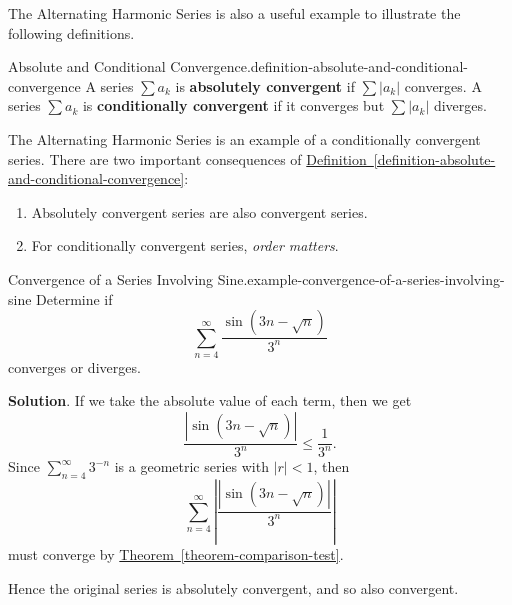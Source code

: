 \documentclass[10pt,]{book}
\newcommand{\terminology}[1]{\textbf{#1}}
\numberwithin{equation}{section}
\newcommand{\lt}{<}
\begin{document}
\hypertarget{p-905}{}%
The Alternating Harmonic Series is also a useful example to illustrate the following definitions.%
\begin{definition}{Absolute and Conditional Convergence.}{definition-absolute-and-conditional-convergence}%
\hypertarget{p-906}{}%
A series \(\sum a_{k}\) is \terminology{absolutely convergent} if \(\sum |a_{k}|\) converges. A series \(\sum a_{k}\) is \terminology{conditionally convergent} if it converges but \(\sum|a_{k}|\) diverges.%
\end{definition}
\hypertarget{p-907}{}%
The Alternating Harmonic Series is an example of a conditionally convergent series. There are two important consequences of \hyperref[definition-absolute-and-conditional-convergence]{Definition~\ref{definition-absolute-and-conditional-convergence}}: \leavevmode%
\begin{enumerate}
\item\hypertarget{li-99}{}\hypertarget{p-908}{}%
Absolutely convergent series are also convergent series.%
\item\hypertarget{li-100}{}\hypertarget{p-909}{}%
For conditionally convergent series, \emph{order matters}.%
\end{enumerate}
%
\begin{example}{Convergence of a Series Involving Sine.}{example-convergence-of-a-series-involving-sine}%
\hypertarget{p-910}{}%
Determine if%
\begin{equation*}
\sum_{n=4}^{\infty}\frac{\sin(3n - \sqrt{n})}{3^{n}}
\end{equation*}
converges or diverges.%
\par\smallskip%
\noindent\textbf{Solution}.\hypertarget{solution-187}{}\quad%
\hypertarget{p-911}{}%
If we take the absolute value of each term, then we get%
\begin{equation*}
\frac{|\sin(3n - \sqrt{n})|}{3^{n}} \leq \frac{1}{3^{n}}\text{.}
\end{equation*}
Since \(\sum_{n=4}^{\infty}3^{-n}\) is a geometric series with \(|r|\lt 1\), then%
\begin{equation*}
\sum_{n=4}^{\infty}\left|\frac{|\sin(3n - \sqrt{n})|}{3^{n}}\right|
\end{equation*}
must converge by \hyperref[theorem-comparison-test]{Theorem~\ref{theorem-comparison-test}}.%
\par
\hypertarget{p-912}{}%
Hence the original series is absolutely convergent, and so also convergent.%
\end{example}
%
%
\typeout{************************************************}
\typeout{************************************************}
%
\end{document}
